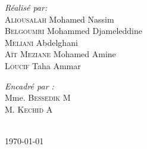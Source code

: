 {\begin{titlepage}
  \noindent
  \begin{minipage}{0.6\textwidth}
      \vspace{-7mm}
    \begin{flushleft} \large
      \emph{Réalisé par:}\\
      \textsc{Aliousalah} Mohamed Nassim\\
      \textsc{Belgoumri} Mohammed Djameleddine\\
      \textsc{Meliani} Abdelghani\\
      \textsc{Aït Meziane} Mohamed Amine\\
      \textsc{Loucif} Taha Ammar\\
    \end{flushleft}
  \end{minipage}
  \begin{minipage}{0.3\textwidth}
    \begin{flushright} \large
      \begin{flushleft} \large
      \emph{Encadré par :} \\
      {
        \small
        Mme. \textsc{Bessedik} M\\[0.1cm]
        M. \textsc{Kechid} A\\[0.1cm]
      }
      \end{flushleft}

    \end{flushright}
  \end{minipage}\\[1cm]


  \vspace{20mm}
  {\large \today}        
  \end{titlepage}
  \restoregeometry
}